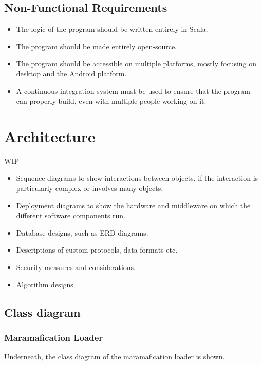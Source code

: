 \documentclass[10pt]{extarticle} %
\begin{document}
    \subsection{Non-Functional Requirements}
    \begin{itemize}
        \item The logic of the program should be written entirely in Scala.
        \item The program should be made entirely open-source.
        \item The program should be accessible on multiple platforms, mostly focusing on desktop and the Android platform.
        \item A continuous integration system must be used to ensure that the program can properly build, even with multiple people working on it.
    \end{itemize}
    \newpage

    \section{Architecture}
    WIP
    \begin{itemize}
        \item Sequence diagrams to show interactions between objects, if the interaction is particularly complex or involves many objects.
        \item Deployment diagrams to show the hardware and middleware on which the different software components run.
        \item Database designs, such as ERD diagrams.
        \item Descriptions of custom protocols, data formats etc.
        \item Security measures and considerations.
        \item Algorithm designs.
    \end{itemize}

    \subsection[class_diagram]{Class diagram}


    \subsubsection{Maramafication Loader}
    Underneath, the class diagram of the maramafication loader is shown.
\end{document}
